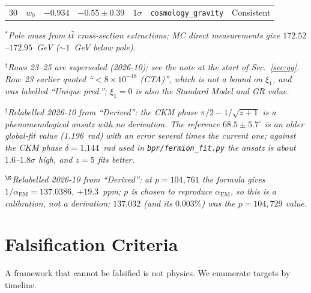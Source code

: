 \documentclass[aps,prd,twocolumn,superscriptaddress,longbibliography,nofootinbib]{revtex4-2}
\newcommand{\alphaEM}{\alpha_{\mathrm{EM}}}
\begin{document}
\begin{table}[t]
\begin{ruledtabular}
\begin{tabular}{rllllll}
30 & $w_0$ & $-0.934$ & $-0.55\pm0.39$ & $1\sigma$ & \texttt{cosmology\_gravity} & Consistent \\
\end{tabular}
\end{ruledtabular}
\textit{$^*$Pole mass from $t\bar{t}$ cross-section extractions;
MC direct measurements give $172.52$--$172.95$~GeV ($\sim 1$~GeV below pole).}\par
\textit{$^\dagger$Rows 23--25 are superseded (2026-10); see the note at
the start of Sec.~\ref{sec:qg}.  Row~23 earlier quoted
``$<8\times10^{-18}$ (CTA)'', which is not a bound on $\xi_1$, and was
labelled ``Unique pred.''; $\xi_1 = 0$ is also the Standard Model and
GR value.}\par
\textit{$^\ddagger$Relabelled 2026-10 from ``Derived'': the CKM phase
$\pi/2 - 1/\!\sqrt{z+1}$ is a phenomenological ansatz with no
derivation.  The reference $68.5\pm5.7^\circ$ is an older global-fit
value (1.196~rad) with an error several times the current one; against
the CKM phase $\delta = 1.144$~rad used in \texttt{bpr/fermion\_fit.py}
the ansatz is about $1.6$--$1.8\sigma$ high, and $z = 5$ fits better.}\par
\textit{$^\S$Relabelled 2026-10 from ``Derived'': at $p = 104{,}761$
the formula gives $1/\alphaEM = 137.0386$, $+19.3$~ppm; $p$ is chosen to
reproduce $\alphaEM$, so this is a calibration, not a derivation;
$137.032$ (and its $0.003\%$) was the $p = 104{,}729$ value.}
\end{table}


\section{Falsification Criteria}
\label{sec:falsification}

A framework that cannot be falsified is not physics.  We enumerate targets
by timeline.
\end{document}
